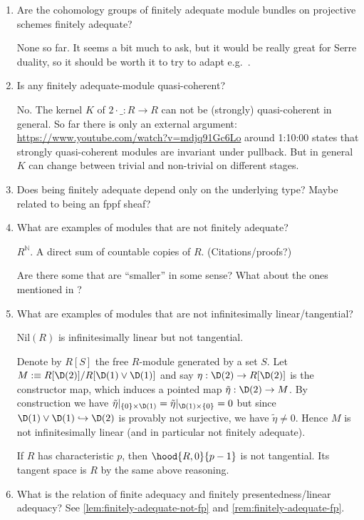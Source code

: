 \begin{enumerate}
\item Are the cohomology groups of finitely adequate module bundles on projective schemes finitely adequate?

      None so far. It seems a bit much to ask, but it would be really great for Serre duality, so it should be worth it to try to adapt e.g.\ \cite[19.1.3]{vakil}.

\item Is any finitely adequate-module quasi-coherent?

      No. The kernel $K$ of $2\cdot\_:R\to R$ can not be (strongly) quasi-coherent in general.
      So far there is only an external argument: \url{https://www.youtube.com/watch?v=mdjq91Gc6Lo} around 1:10:00 states that strongly quasi-coherent modules are invariant under pullback. But in general $K$ can change between trivial and non-trivial on different stages.
\item Does being finitely adequate depend only on the underlying type?  Maybe related to being an fppf sheaf?
\item What are examples of modules that are not finitely adequate?

      $R^\mathbb{N}$.  A direct sum of countable copies of $R$.  (Citations/proofs?)

      Are there some that are ``smaller'' in some sense?
      What about the ones mentioned in ?


\item What are examples of modules that are not infinitesimally linear/tangential?

      $\mathrm{Nil}(R)$ is infinitesimally linear but not tangential.

      Denote by $R[S]$ the free $R$-module generated by a set $S$.
      Let $M :\equiv R[\D(2)]/R[\D(1)\vee\D(1)]$ and say $\eta : \D(2) \to R[\D(2)]$ is the constructor map, which induces a pointed map $\tilde{\eta} : \D(2) \to M$.
      By construction we have $\tilde{\eta}|_{\{0\} \times \D(1)} = \tilde{\eta}|_{\D(1) \times \{0\}} = 0$ but since $\D(1)\vee\D(1) \lhook\joinrel\to \D(2)$ is provably not surjective, we have $\tilde{\eta} \neq 0$.
      Hence $M$ is not infinitesimally linear (and in particular not finitely adequate).

      If $R$ has characteristic $p$, then $\hood{R,0}{p-1}$ is not tangential. Its tangent space is $R$ by the same above reasoning.

\item What is the relation of finite adequacy and finitely presentedness/linear adequacy?
See \cref{lem:finitely-adequate-not-fp} and \cref{rem:finitely-adequate-fp}.


\end{enumerate}
